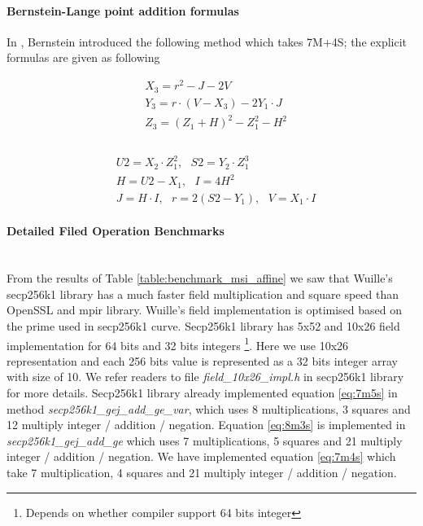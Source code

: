 \paragraph{Bernstein-Lange point addition formulas}
In \cite{bernstein2007faster}, Bernstein introduced the following method which takes 7M+4S; the explicit formulas are given as following \cite{bernstein2007explicit}
\begin{small}
\begin{equation} \label{eq:7m4s}
\begin{split}
& X_3 = r^2 - J - 2 V \\
& Y_3 = r \cdot (V-X_3)-2Y_1 \cdot J \\
& Z_3 = (Z_1+H)^2 - Z_1^2 - H^2 \\
\end{split}
\end{equation}
\\
\begin{equation*}
\begin{split}
& U2 = X_2 \cdot Z_1^2,\text{ } S2 = Y_2 \cdot Z_1^3 \\
& H = U2 - X_1 , \text{ } I = 4 H^2 \\
& J = H \cdot I , \text{ } r = 2  (S2-Y_1) , \text{ } V = X_1 \cdot I 
\end{split}
\end{equation*}
\end{small}



\paragraph{Detailed Filed Operation Benchmarks} \mbox{} \\
From the results of Table \ref {table:benchmark_msi_affine} we saw that Wuille's secp256k1 library \cite{Wulliesecp256k1} has a much faster field multiplication and square speed than OpenSSL and mpir library.
Wuille's field implementation is optimised based on the prime used in secp256k1 curve. Secp256k1 library has 5x52 and 10x26 field implementation for 64 bits and 32 bits integers \footnote {Depends on whether compiler support 64 bits integer}. Here we use 10x26 representation and each 256 bits value is represented as a 32 bits integer array with size of 10. We refer readers to file \textit{field\_10x26\_impl.h} in secp256k1 library for more details. Secp256k1 library already implemented equation \ref{eq:7m5s} in method \textit{secp256k1\_gej\_add\_ge\_var}, which uses 8 multiplications, 3 squares and 12 multiply integer / addition / negation. Equation \ref{eq:8m3s} is implemented in \textit{secp256k1\_gej\_add\_ge} which uses 7 multiplications, 5 squares and 21 multiply integer / addition / negation. We have implemented equation \ref{eq:7m4s} which take 7 multiplication, 4 squares and 21 multiply integer / addition / negation.

